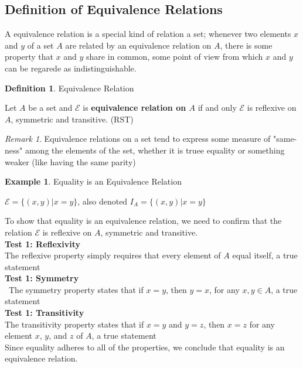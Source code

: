 \documentclass{book}
\theoremstyle{definition}
\newtheorem{definition}{Definition}[section]
\newtheorem{example}{Example}[definition]
\theoremstyle{remark}
\newtheorem{remark}{Remark}
\newcommand{\cc}[1]{\mathcal{#1}}
\begin{document}
\subsection{Definition of Equivalence Relations}

    A equivalence relation is a special kind of relation a set; whenever two elements $x$ and $y$ of a set $A$ are related by an equivalence relation on $A$, there is some property that $x$ and $y$ share in common, some point of view from which $x$ and $y$ can be regarede as indistinguishable. 

    \begin{definition}
        Equivalence Relation \\
        
        \begin{tcolorbox}
            Let $A$ be a set and $\cc{E}$ is \textbf{equivalence relation on $A$} if and only $\cc{E}$ is reflexive on $A$, symmetric and transitive. (RST)
        \end{tcolorbox}
    \end{definition}

    \begin{remark}
        Equivalence relations on a set tend to express some measure of "same-ness" among the elements of the set, whether it is truee equality or something weaker (like having the same parity)
    \end{remark}
    
    
    
    \begin{example}
    Equality is an Equivalence Relation \\
    
        \begin{center}
            $\cc{E} = \{ (x,y) | x=y\}$, also denoted $I_A = \{ (x,y) | x=y\}$
        \end{center}
    
        To show that equality is an equivalence relation, we need to confirm that the relation $\cc{E}$ is reflexive on $A$, symmetric and transitive. \\
        
            \textbf{Test 1: Reflexivity } \\
                The reflexive property simply requires that every element of $A$ equal itself, a true statement \\
            \textbf{Test 1: Symmetry } \\
            \   The symmetry property states that if $x=y$, then $y=x$, for any $x,y \in A$, a true statement \\
            \textbf{Test 1: Transitivity } \\
                The transitivity property states that if $x=y$ and $y=z$, then $x=z$ for any element $x$, $y$, and $z$ of $A$, a true statement \\
                
        Since equality adheres to all of the properties, we conclude that equality is an equivalence relation. 
    \end{example}
    
\end{document}
